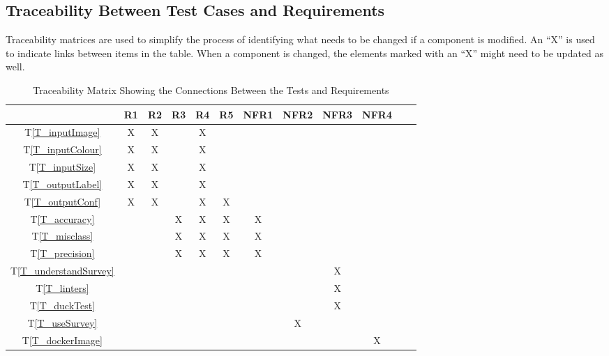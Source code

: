 \documentclass[12pt, titlepage]{article}
\newcommand{\tref}[1]{T\ref{#1}}
\begin{document}
\subsection{Traceability Between Test Cases and Requirements}

Traceability matrices are used to simplify the process of identifying what needs to be changed 
if a component is modified. An ``X'' is used to indicate links between items in the table. 
When a component is changed, the elements marked with an ``X'' might need to be updated as well.

\begin{table}[h!]
  \centering
  \begin{tabular}{|c|c|c|c|c|c|c|c|c|c|c|c|}
  \hline
    & R1
    & R2
    & R3
    & R4
    & R5
    & NFR1
    & NFR2
    & NFR3
    & NFR4
  \\ \hline
  \tref{T_inputImage}           &X&X& &X& & & & & \\ \hline
  \tref{T_inputColour}          &X&X& &X& & & & & \\ \hline
  \tref{T_inputSize}            &X&X& &X& & & & & \\ \hline
  \tref{T_outputLabel}          &X&X& &X& & & & & \\ \hline
  \tref{T_outputConf}           &X&X& &X&X& & & & \\ \hline
  \tref{T_accuracy}             & & &X&X&X&X& & & \\ \hline
  \tref{T_misclass}             & & &X&X&X&X& & & \\ \hline
  \tref{T_precision}            & & &X&X&X&X& & & \\ \hline
  \tref{T_understandSurvey}     & & & & & & & &X& \\ \hline
  \tref{T_linters}              & & & & & & & &X& \\ \hline
  \tref{T_duckTest}             & & & & & & & &X& \\ \hline
  \tref{T_useSurvey}            & & & & & & &X& & \\ \hline
  \tref{T_dockerImage}          & & & & & & & & &X\\ \hline
  \end{tabular}
  \caption{Traceability Matrix Showing the Connections Between the Tests and Requirements}
  \label{Table:A_trace}
\end{table}

\newpage
\end{document}
